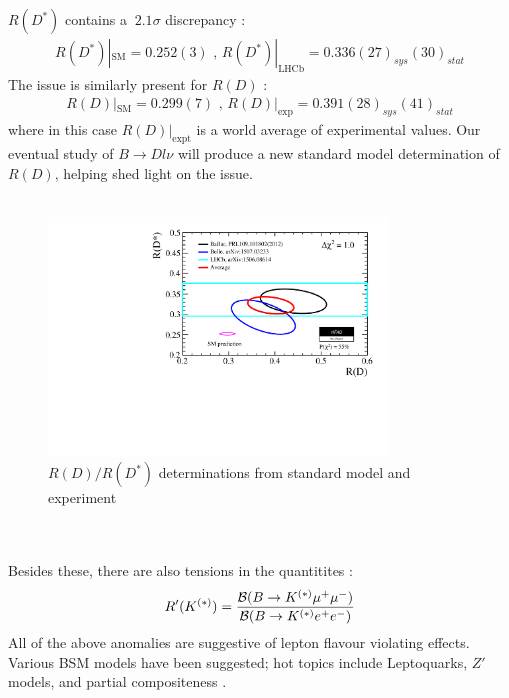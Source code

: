 $R(D^*)$ contains a $~2.1\sigma$ discrepancy \cite{Aaij:2015yra}:
\begin{align}
	R(D^*)|_{\text{SM}} = 0.252(3) \text{ , } R(D^*)|_{\text{LHCb}} = 0.336(27)_{sys}(30)_{stat}
\end{align}
The issue is similarly present for $R(D)$ \cite{Monahan:2017uby}:
\begin{align}
	R(D)|_{\text{SM}} = 0.299(7) \text{ , } R(D)|_{\text{exp}} = 0.391(28)_{sys}(41)_{stat}
\end{align}
where in this case $R(D)|_{\text{expt}}$ is a world average of experimental values. Our eventual study of $B\to Dl\nu$ will produce a new standard model determination of $R(D)$, helping shed light on the issue.
\\ \\
\begin{figure}
  \begin{center}
    \includegraphics[width=
   0.8\textwidth]{images/rdrds_eps15.pdf}
  \end{center}
  \caption{$R(D)/R(D^*)$ determinations from standard model and experiment \cite{HFAG}}
  \label{fig:semileptonic}
\end{figure}
\\ \\
Besides these, there are also tensions in the quantitites \cite{Altmannshofer:2017yso}:
\begin{align}
	R'(K^{(*)}) = {\mathcal{B}( B\to K^{(*)}\mu^+\mu^-)\over \mathcal{B}( B\to K^{(*)} e^+e^-)}
\end{align}
All of the above anomalies are suggestive of lepton flavour violating effects. Various BSM models have been suggested; hot topics include Leptoquarks, $Z'$ models, and partial compositeness \cite{Altmannshofer:2017yso}.

